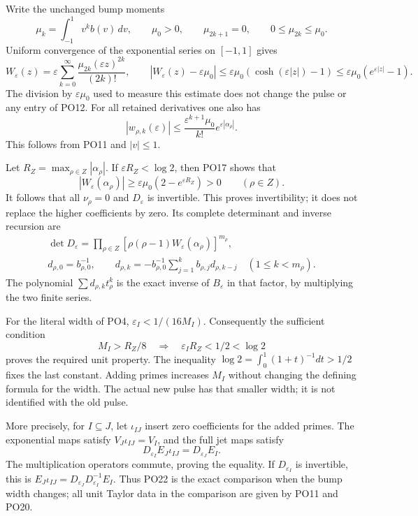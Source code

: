 \documentclass[11pt,a4paper]{article}
\theoremstyle{definition}\newtheorem{definition}[theorem]{Definition}
\begin{document}
Write the unchanged bump moments
\[
 \mu_k=\int_{-1}^1v^k b(v)\,dv,\qquad
 \mu_0>0,\qquad \mu_{2k+1}=0,\qquad 0\le\mu_{2k}\le\mu_0 .
 \tag{PO16}
\]
Uniform convergence of the exponential series on \([-1,1]\)
gives
\[
 W_\varepsilon(z)=\varepsilon\sum_{k=0}^\infty
              \frac{\mu_{2k}(\varepsilon z)^{2k}}{(2k)!},
 \qquad
 |W_\varepsilon(z)-\varepsilon\mu_0|
       \le\varepsilon\mu_0(\cosh(\varepsilon|z|)-1)
       \le\varepsilon\mu_0(e^{\varepsilon|z|}-1).
 \tag{PO17}\label{PO:po:unit-control}
\]
The division by \(\varepsilon\mu_0\) used to measure this estimate does
not change the pulse or any entry of PO12.
For all retained derivatives one also has
\[
 |w_{\rho,k}(\varepsilon)|
   \le\frac{\varepsilon^{k+1}\mu_0}{k!}e^{\varepsilon|\alpha_\rho|}.
 \tag{PO18}\label{PO:po:derivative-bound}
\]
This follows from PO11 and \(|v|\le1\).

Let \(R_Z=\max_{\rho\in Z}|\alpha_\rho|\).
If \(\varepsilon R_Z<\log2\), then PO17 shows that
\[
 |W_\varepsilon(\alpha_\rho)|
   \ge\varepsilon\mu_0(2-e^{\varepsilon R_Z})>0
                    \qquad(\rho\in Z).
 \tag{PO19}\label{PO:po:unit-criterion}
\]
It follows that all \(\nu_\rho=0\) and \(D_\varepsilon\) is invertible.
This proves invertibility; it does not replace the higher
coefficients by zero. Its complete determinant and inverse recursion are
\[
 \begin{gathered}
 \det D_\varepsilon=\prod_{\rho\in Z}
       [\rho(\rho-1)W_\varepsilon(\alpha_\rho)]^{m_\rho},\\
 d_{\rho,0}=b_{\rho,0}^{-1},\qquad
 d_{\rho,k}=-b_{\rho,0}^{-1}
                \sum_{j=1}^k b_{\rho,j}d_{\rho,k-j}
                   \quad(1\le k<m_\rho).
 \end{gathered}
 \tag{PO20}\label{PO:po:inverse}
\]
The polynomial \(\sum d_{\rho,k}t_\rho^k\) is the exact inverse
of \(B_\varepsilon\) in that factor, by multiplying the two finite series.

For the literal width of PO4,
\(\varepsilon_I<1/(16M_I)\). Consequently the sufficient condition
\[
 M_I>R_Z/8
 \quad\Longrightarrow\quad
 \varepsilon_I R_Z<1/2<\log2
 \tag{PO21}\label{PO:po:width}
\]
proves the required unit property. The inequality
\(\log2=\int_0^1(1+t)^{-1}dt>1/2\) fixes the last constant.
Adding primes increases \(M_I\) without changing the defining
formula for the width. The actual new pulse has that smaller
width; it is not identified with the old pulse.

More precisely, for \(I\subseteq J\), let
\(\iota_{IJ}\) insert zero coefficients for the added primes.
The exponential maps satisfy \(V_J\iota_{IJ}=V_I\), and the
full jet maps satisfy
\[
 D_{\varepsilon_I}E_J\iota_{IJ}=D_{\varepsilon_J}E_I.
 \tag{PO22}\label{PO:po:width-change}
\]
The multiplication operators commute, proving the equality.
If \(D_{\varepsilon_I}\) is invertible, this is
\(E_J\iota_{IJ}=D_{\varepsilon_J}D_{\varepsilon_I}^{-1}E_I\).
Thus PO22 is the exact comparison when the bump width changes;
all unit Taylor data in the comparison are given by PO11 and PO20.
\end{document}
